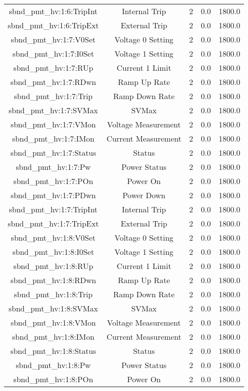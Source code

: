\begin{table}[ptb]
\begin{tabular}{c | c c c c}
sbnd_pmt_hv:1:6:TripInt & Internal Trip & 2 & 0.0 & 1800.0\\ 
sbnd_pmt_hv:1:6:TripExt & External Trip & 2 & 0.0 & 1800.0\\ 
sbnd_pmt_hv:1:7:V0Set & Voltage 0 Setting & 2 & 0.0 & 1800.0\\ 
sbnd_pmt_hv:1:7:I0Set & Voltage 1 Setting & 2 & 0.0 & 1800.0\\ 
sbnd_pmt_hv:1:7:RUp & Current 1 Limit & 2 & 0.0 & 1800.0\\ 
sbnd_pmt_hv:1:7:RDwn & Ramp Up Rate & 2 & 0.0 & 1800.0\\ 
sbnd_pmt_hv:1:7:Trip & Ramp Down Rate & 2 & 0.0 & 1800.0\\ 
sbnd_pmt_hv:1:7:SVMax & SVMax & 2 & 0.0 & 1800.0\\ 
sbnd_pmt_hv:1:7:VMon & Voltage Measurement & 2 & 0.0 & 1800.0\\ 
sbnd_pmt_hv:1:7:IMon & Current Measurement & 2 & 0.0 & 1800.0\\ 
sbnd_pmt_hv:1:7:Status & Status & 2 & 0.0 & 1800.0\\ 
sbnd_pmt_hv:1:7:Pw & Power Status & 2 & 0.0 & 1800.0\\ 
sbnd_pmt_hv:1:7:POn & Power On & 2 & 0.0 & 1800.0\\ 
sbnd_pmt_hv:1:7:PDwn & Power Down & 2 & 0.0 & 1800.0\\ 
sbnd_pmt_hv:1:7:TripInt & Internal Trip & 2 & 0.0 & 1800.0\\ 
sbnd_pmt_hv:1:7:TripExt & External Trip & 2 & 0.0 & 1800.0\\ 
sbnd_pmt_hv:1:8:V0Set & Voltage 0 Setting & 2 & 0.0 & 1800.0\\ 
sbnd_pmt_hv:1:8:I0Set & Voltage 1 Setting & 2 & 0.0 & 1800.0\\ 
sbnd_pmt_hv:1:8:RUp & Current 1 Limit & 2 & 0.0 & 1800.0\\ 
sbnd_pmt_hv:1:8:RDwn & Ramp Up Rate & 2 & 0.0 & 1800.0\\ 
sbnd_pmt_hv:1:8:Trip & Ramp Down Rate & 2 & 0.0 & 1800.0\\ 
sbnd_pmt_hv:1:8:SVMax & SVMax & 2 & 0.0 & 1800.0\\ 
sbnd_pmt_hv:1:8:VMon & Voltage Measurement & 2 & 0.0 & 1800.0\\ 
sbnd_pmt_hv:1:8:IMon & Current Measurement & 2 & 0.0 & 1800.0\\ 
sbnd_pmt_hv:1:8:Status & Status & 2 & 0.0 & 1800.0\\ 
sbnd_pmt_hv:1:8:Pw & Power Status & 2 & 0.0 & 1800.0\\ 
sbnd_pmt_hv:1:8:POn & Power On & 2 & 0.0 & 1800.0\\ 

\end{tabular}
\end{table}
